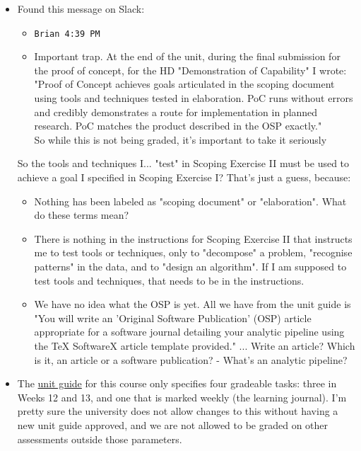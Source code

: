 \documentclass[12pt]{article}
\begin{document}
\begin{itemize}
    \item Found this message on Slack: 
    \begin{itemize}
    \renewcommand{\labelitemii}{}
        \item \texttt{Brian 4:39 PM}
        \item Important trap. At the end of the unit, during the final submission for the proof of concept, for the HD "Demonstration of Capability" I wrote: "Proof of Concept achieves goals articulated in the scoping document using tools and techniques tested in elaboration. PoC runs without errors and credibly demonstrates a route for implementation in planned research. PoC matches the product described in the OSP exactly."
        \\So while this is not being graded, it's important to take it seriously
    \end{itemize}
    So the tools and techniques I... "test" in Scoping Exercise II must be used to achieve a goal I specified in Scoping Exercise I? That's just a guess, because:
    \begin{itemize}
        \item Nothing has been labeled as "scoping document" or "elaboration". What do these terms mean?
        \item There is nothing in the instructions for Scoping Exercise II that instructs me to test tools or techniques, only to "decompose" a problem, "recognise patterns" in the data, and to "design an algorithm". If I am supposed to test tools and techniques, that needs to be in the instructions.
        \item We have no idea what the OSP is yet. All we have from the unit guide is "You will write an 'Original Software Publication' (OSP) article appropriate for a software journal detailing your analytic pipeline using the TeX SoftwareX article template provided."
        ... Write an article? Which is it, an article or a software publication? 
        - What's an analytic pipeline? 
    \end{itemize}
    \item The \href{https://unitguides.mq.edu.au/unit_offerings/95891/unit_guide#assessment_task_257486}{unit guide} for this course only specifies four gradeable tasks: three in Weeks 12 and 13, and one that is marked weekly (the learning journal). I'm pretty sure the university does not allow changes to this without having a new unit guide approved, and we are not allowed to be graded on other assessments outside those parameters.

\end{itemize}
\end{document}
